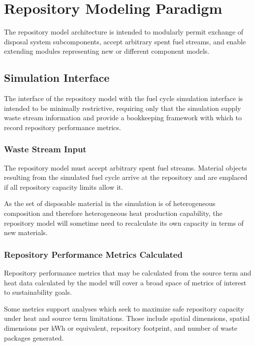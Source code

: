 \section{Repository Modeling Paradigm}

The repository model architecture is intended to modularly permit 
exchange of disposal system subcomponents, accept arbitrary spent fuel 
streams, and enable extending modules representing new or different 
component models.

\subsection{Simulation Interface}

The interface of the repository model with the \Cyclus fuel cycle 
simulation interface is intended to be minimally restrictive, 
requiring only that the simulation supply waste stream information and 
provide a bookkeeping framework with which to record repository 
performance metrics. 

\subsubsection{Waste Stream Input}

The repository model must accept arbitrary spent fuel streams.  
Material objects resulting from the simulated fuel cycle arrive at the  
repository and are emplaced if all repository capacity limits allow 
it.

As the set of disposable material in the simulation is of heterogeneous 
composition and therefore heterogeneous heat production capability, the 
repository model will sometime need to recalculate its own capacity in terms of  
new materials.

\subsubsection{Repository Performance Metrics Calculated}

Repository performance metrics that may be calculated from the source 
term and heat data calculated by the model will cover a broad space of 
metrics of interest to sustainability goals. 

Some metrics support analyses which seek to maximize safe repository 
capacity under heat and source term limitations. Those include spatial 
dimensions, spatial dimensions per kWh or equivalent, repository 
footprint, and number of waste packages generated.


